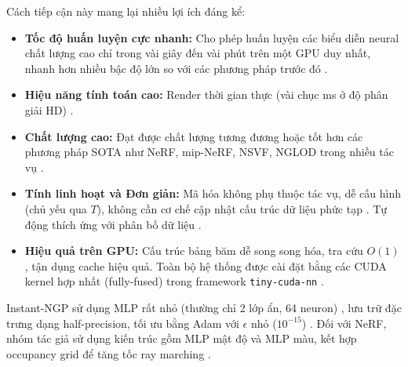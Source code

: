 Cách tiếp cận này mang lại nhiều lợi ích đáng kể:
\begin{itemize}
    \item \textbf{Tốc độ huấn luyện cực nhanh:} Cho phép huấn luyện các biểu diễn neural chất lượng cao chỉ trong vài giây đến vài phút trên một GPU duy nhất, nhanh hơn nhiều bậc độ lớn so với các phương pháp trước đó \cite{Muller2022InstantNGP_source_1, Muller2022InstantNGP_source_6, Muller2022InstantNGP_source_16, Muller2022InstantNGP_source_131, Muller2022InstantNGP_source_293, Muller2022InstantNGP_source_345}.
    \item \textbf{Hiệu năng tính toán cao:} Render thời gian thực (vài chục ms ở độ phân giải HD) \cite{Muller2022InstantNGP_source_16, Muller2022InstantNGP_source_255, Muller2022InstantNGP_source_272}.
    \item \textbf{Chất lượng cao:} Đạt được chất lượng tương đương hoặc tốt hơn các phương pháp SOTA như NeRF, mip-NeRF, NSVF, NGLOD trong nhiều tác vụ \cite{Muller2022InstantNGP_source_6, Muller2022InstantNGP_source_30, Muller2022InstantNGP_source_138, Muller2022InstantNGP_source_216, Muller2022InstantNGP_source_292}.
    \item \textbf{Tính linh hoạt và Đơn giản:} Mã hóa không phụ thuộc tác vụ, dễ cấu hình (chủ yếu qua $T$), không cần cơ chế cập nhật cấu trúc dữ liệu phức tạp \cite{Muller2022InstantNGP_source_7, Muller2022InstantNGP_source_29, Muller2022InstantNGP_source_36, Muller2022InstantNGP_source_94, Muller2022InstantNGP_source_195, Muller2022InstantNGP_source_343}. Tự động thích ứng với phân bố dữ liệu \cite{Muller2022InstantNGP_source_158, Muller2022InstantNGP_source_159}.
    \item \textbf{Hiệu quả trên GPU:} Cấu trúc bảng băm dễ song song hóa, tra cứu $O(1)$, tận dụng cache hiệu quả. Toàn bộ hệ thống được cài đặt bằng các CUDA kernel hợp nhất (fully-fused) trong framework \texttt{tiny-cuda-nn} \cite{Muller2021TinyCuDNN, Muller2022InstantNGP_source_15, Muller2022InstantNGP_source_37, Muller2022InstantNGP_source_38, Muller2022InstantNGP_source_39, Muller2022InstantNGP_source_100, Muller2022InstantNGP_source_167}.
\end{itemize}

Instant-NGP sử dụng MLP rất nhỏ (thường chỉ 2 lớp ẩn, 64 neuron) \cite{Muller2022InstantNGP_source_178}, lưu trữ đặc trưng dạng half-precision, tối ưu bằng Adam với $\epsilon$ nhỏ ($10^{-15}$) \cite{Kingma2014Adam, Muller2022InstantNGP_source_168, Muller2022InstantNGP_source_184}. Đối với NeRF, nhóm tác giả sử dụng kiến trúc gồm MLP mật độ và MLP màu, kết hợp occupancy grid để tăng tốc ray marching \cite{Muller2022InstantNGP_source_262, Muller2022InstantNGP_source_270, Muller2022InstantNGP_source_490}.


